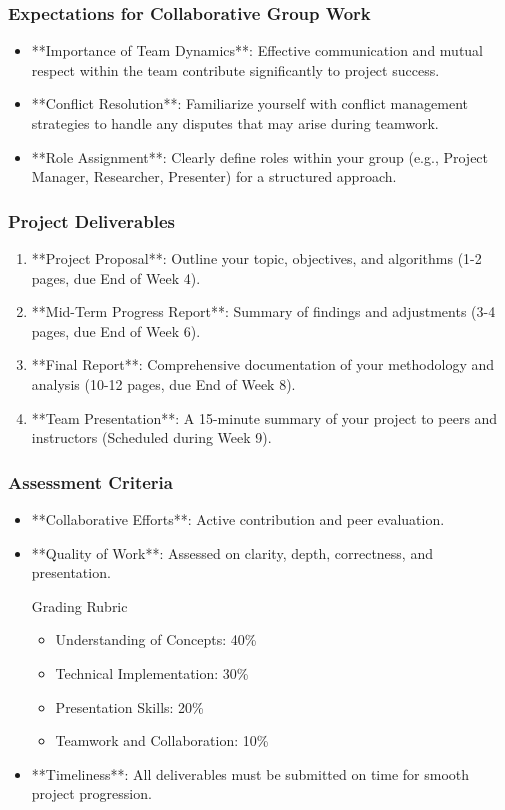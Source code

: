 \documentclass[aspectratio=169]{beamer}
\begin{document}
\begin{frame}[fragile]
    \frametitle{Expectations for Collaborative Group Work}
    \begin{itemize}
        \item **Importance of Team Dynamics**: Effective communication and mutual respect within the team contribute significantly to project success.
        \item **Conflict Resolution**: Familiarize yourself with conflict management strategies to handle any disputes that may arise during teamwork.
        \item **Role Assignment**: Clearly define roles within your group (e.g., Project Manager, Researcher, Presenter) for a structured approach.
    \end{itemize}
\end{frame}

\begin{frame}[fragile]
    \frametitle{Project Deliverables}
    \begin{enumerate}
        \item **Project Proposal**: Outline your topic, objectives, and algorithms (1-2 pages, due End of Week 4).
        \item **Mid-Term Progress Report**: Summary of findings and adjustments (3-4 pages, due End of Week 6).
        \item **Final Report**: Comprehensive documentation of your methodology and analysis (10-12 pages, due End of Week 8).
        \item **Team Presentation**: A 15-minute summary of your project to peers and instructors (Scheduled during Week 9).
    \end{enumerate}
\end{frame}

\begin{frame}[fragile]
    \frametitle{Assessment Criteria}
    \begin{itemize}
        \item **Collaborative Efforts**: Active contribution and peer evaluation.
        \item **Quality of Work**: Assessed on clarity, depth, correctness, and presentation.
        \begin{block}{Grading Rubric}
            \begin{itemize}
                \item Understanding of Concepts: 40\%
                \item Technical Implementation: 30\%
                \item Presentation Skills: 20\%
                \item Teamwork and Collaboration: 10\%
            \end{itemize}
        \end{block}
        \item **Timeliness**: All deliverables must be submitted on time for smooth project progression.
    \end{itemize}
\end{frame}
\end{document}
